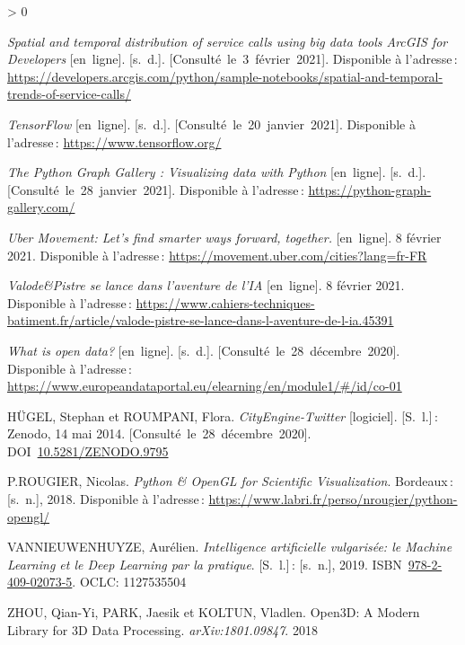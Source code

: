 \documentclass[
  11pt,
  french,
]{article}
\newlength{\cslhangindent}
\newenvironment{CSLReferences}[2] %
 {%
  \setlength{\parindent}{0pt}
  \ifodd #1 \everypar{\setlength{\hangindent}{\cslhangindent}}\ignorespaces\fi
  \ifnum #2 > 0
  \setlength{\parskip}{#2\baselineskip}
  \fi
 }%
 {}
\begin{document}
\begin{CSLReferences}{0}{0}
\leavevmode\hypertarget{ref-arcgis1}{}%
\emph{Spatial and temporal distribution of service calls using big data
tools \textbar{} ArcGIS for Developers} {[}en~ligne{]}. {[}s.~d.{]}.
{[}Consulté~le~3~février~2021{]}. Disponible à l'adresse\,:
\url{https://developers.arcgis.com/python/sample-notebooks/spatial-and-temporal-trends-of-service-calls/}

\leavevmode\hypertarget{ref-tensorflow}{}%
\emph{TensorFlow} {[}en~ligne{]}. {[}s.~d.{]}.
{[}Consulté~le~20~janvier~2021{]}. Disponible à l'adresse\,:
\url{https://www.tensorflow.org/}

\leavevmode\hypertarget{ref-pythondataviz}{}%
\emph{The Python Graph Gallery : Visualizing data with Python}
{[}en~ligne{]}. {[}s.~d.{]}. {[}Consulté~le~28~janvier~2021{]}.
Disponible à l'adresse\,: \url{https://python-graph-gallery.com/}

\leavevmode\hypertarget{ref-uberopen}{}%
\emph{Uber Movement: Let's find smarter ways forward, together.}
{[}en~ligne{]}. 8 février 2021. Disponible à l'adresse\,:
\url{https://movement.uber.com/cities?lang=fr-FR}

\leavevmode\hypertarget{ref-valodepistre}{}%
\emph{Valode\&Pistre se lance dans l'aventure de l'IA} {[}en~ligne{]}. 8
février 2021. Disponible à l'adresse\,:
\url{https://www.cahiers-techniques-batiment.fr/article/valode-pistre-se-lance-dans-l-aventure-de-l-ia.45391}

\leavevmode\hypertarget{ref-opendataeu}{}%
\emph{What is open data?} {[}en~ligne{]}. {[}s.~d.{]}.
{[}Consulté~le~28~décembre~2020{]}. Disponible à l'adresse\,:
\url{https://www.europeandataportal.eu/elearning/en/module1/\#/id/co-01}

\leavevmode\hypertarget{ref-hugel_cityengine-twitter_2014}{}%
HÜGEL, Stephan et ROUMPANI, Flora. \emph{{CityEngine}-Twitter}
{[}logiciel{]}. {[}S.~l.{]}\,: Zenodo, 14 mai 2014.
{[}Consulté~le~28~décembre~2020{]}.
DOI~\href{https://doi.org/10.5281/ZENODO.9795}{10.5281/ZENODO.9795}

\leavevmode\hypertarget{ref-pyopenglcrit}{}%
P.ROUGIER, Nicolas. \emph{Python \& OpenGL for Scientific
Visualization}. Bordeaux\,: {[}s.~n.{]}, 2018. Disponible à l'adresse\,:
\url{https://www.labri.fr/perso/nrougier/python-opengl/}

\leavevmode\hypertarget{ref-iavulga}{}%
VANNIEUWENHUYZE, Aurélien. \emph{Intelligence artificielle vulgarisée:
le Machine Learning et le Deep Learning par la pratique}. {[}S.~l.{]}\,:
{[}s.~n.{]}, 2019.
ISBN~\href{https://worldcat.org/isbn/978-2-409-02073-5}{978-2-409-02073-5}.
{OCLC}: 1127535504

\leavevmode\hypertarget{ref-Zhou2018}{}%
ZHOU, Qian-Yi, PARK, Jaesik et KOLTUN, Vladlen. {Open3D}: {A} Modern
Library for {3D} Data Processing. \emph{arXiv:1801.09847}. 2018

\end{CSLReferences}
\end{document}
